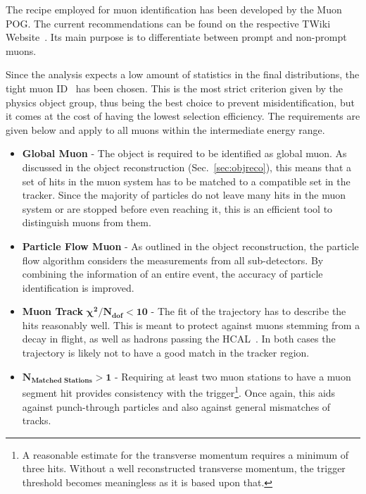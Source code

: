 The recipe employed for muon identification has been developed by the Muon POG. The current recommendations can be found on the respective TWiki Website~\cite{muonpog}. Its main purpose is to differentiate between prompt and non-prompt muons.

Since the analysis expects a low amount of statistics in the final distributions, the tight muon ID~\cite{muonid1, muonid2} has been chosen. This is the most strict criterion given by the physics object group, thus being the best choice to prevent misidentification, but it comes at the cost of having the lowest selection efficiency. The requirements are given below and apply to all muons within the intermediate energy range.

\begin{itemize}
\item \textbf{Global Muon} - The object is required to be identified as global muon. As discussed in the object reconstruction (Sec.~\ref{sec:objreco}), this means that a set of hits in the muon system has to be matched to a compatible set in the tracker. Since the majority of particles do not leave many hits in the muon system or are stopped before even reaching it, this is an efficient tool to distinguish muons from them.
\item \textbf{Particle Flow Muon} - As outlined in the object reconstruction, the particle flow algorithm considers the measurements from all sub-detectors. By combining the information of an entire event, the accuracy of particle identification is improved.
\item \textbf{Muon Track} $\mathbf{\chi^2 / N_{\textbf{dof}} < 10}$ - The fit of the trajectory has to describe the hits reasonably well. This is meant to protect against muons stemming from a decay in flight, as well as hadrons passing the HCAL~\cite{muonidcosmic}. In both cases the trajectory is likely not to have a good match in the tracker region.
\item $\mathbf{N_{\textbf{Matched Stations}} > 1}$ - Requiring at least two muon stations to have a muon segment hit provides consistency with the trigger\footnote{A reasonable estimate for the transverse momentum requires a minimum of three hits. Without a well reconstructed transverse momentum, the trigger threshold becomes meaningless as it is based upon that.}. Once again, this aids against punch-through particles and also against general mismatches of tracks.

\end{itemize}
